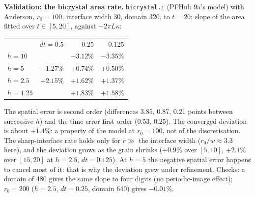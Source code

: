 \documentclass[11pt]{article}
\begin{document}
\textbf{Validation: the bicrystal area rate.} \texttt{bicrystal.i} (PFHub 9a's
model) with Anderson, $r_0 = 100$, interface width 30, domain 320, to $t = 20$;
slope of the area fitted over $t \in [5, 20]$, against $-2\pi L\kappa$:
\begin{center}
\begin{tabular}{lrrr}
 & $dt = 0.5$ & $0.25$ & $0.125$ \\
$h = 10$ & & $-3.12\%$ & $-3.35\%$ \\
$h = 5$ & $+1.27\%$ & $+0.74\%$ & $+0.50\%$ \\
$h = 2.5$ & $+2.15\%$ & $+1.62\%$ & $+1.37\%$ \\
$h = 1.25$ & & $+1.83\%$ & $+1.58\%$ \\
\end{tabular}
\end{center}
The spatial error is second order (differences $3.85$, $0.87$, $0.21$ points
between successive $h$) and the time error first order ($0.53$, $0.25$). The
converged deviation is about $+1.4\%$: a property of the model at $r_0 = 100$, not
of the discretisation. The sharp-interface rate holds only for $r \gg$ the interface
width ($r_0/w \approx 3.3$ here), and the deviation grows as the grain shrinks
($+0.9\%$ over $[5,10]$, $+2.1\%$ over $[15,20]$ at $h = 2.5$, $dt = 0.125$). At
$h = 5$ the negative spatial error happens to cancel most of it: that is why the
deviation grew under refinement. Checks: a domain of 480 gives the same slope to
four digits (no periodic-image effect); $r_0 = 200$ ($h = 2.5$, $dt = 0.25$,
domain 640) gives $-0.01\%$.
\end{document}
